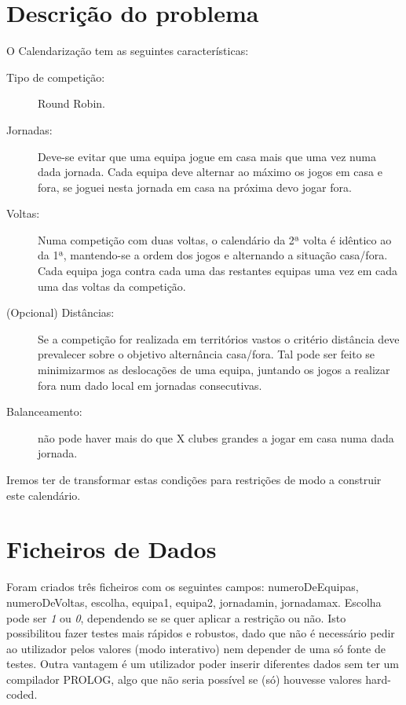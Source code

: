\documentclass[runningheads,a4paper]{llncs}
\begin{document}
\section{Descrição do problema}
O Calendarização tem as seguintes características:
\begin{description}
\item[Tipo de competição:] Round Robin.
\item[Jornadas:] Deve-se evitar que uma equipa jogue em casa mais que uma vez numa dada jornada. Cada equipa deve alternar ao máximo os jogos em casa e fora, se joguei nesta jornada em casa na próxima devo jogar fora.
\item[Voltas:] Numa competição com duas voltas, o calendário da 2ª volta é idêntico ao da 1ª, mantendo-se a ordem dos jogos e alternando a situação casa/fora. Cada equipa joga contra cada uma das restantes equipas uma vez em cada uma das voltas da competição.
\item[(Opcional) Distâncias:] Se a competição for realizada em territórios vastos o critério distância deve prevalecer sobre o objetivo alternância casa/fora. Tal pode ser feito se minimizarmos as deslocações de uma equipa, juntando os jogos a realizar fora num dado local em jornadas consecutivas.
\item[Balanceamento:] não pode haver mais do que X clubes grandes a jogar em casa numa dada jornada.
\end{description}
Iremos ter de transformar estas condições para restrições de modo a construir este calendário.

\section{Ficheiros de Dados}
Foram criados três ficheiros com os seguintes campos: numeroDeEquipas, numeroDeVoltas, escolha, equipa1, equipa2, jornadamin, jornadamax. Escolha pode ser \textit{1} ou \textit{0}, dependendo se se quer aplicar a restrição ou não. Isto possibilitou fazer testes mais rápidos e robustos, dado que não é necessário pedir ao utilizador pelos valores (modo interativo) nem depender de uma só fonte de testes. Outra vantagem é um utilizador poder inserir diferentes dados sem ter um compilador PROLOG, algo que não seria possível se (só) houvesse valores hard-coded.
\end{document}
